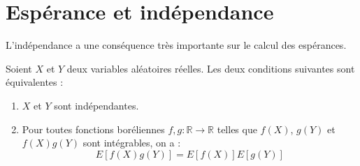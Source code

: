 \section{Espérance et indépendance}
L'indépendance a une conséquence très importante sur le calcul des espérances.
\begin{proposition}
Soient $X$ et $Y$ deux variables aléatoires réelles. Les deux conditions suivantes sont équivalentes :
\begin{enumerate}
    \item[i)] $X$ et $Y$ sont indépendantes.
    \item[ii)] Pour toutes fonctions boréliennes $f, g: \mathbb{R} \to \mathbb{R}$ telles que $f(X)$, $g(Y)$ et $f(X)g(Y)$ sont intégrables, on a :
    \[ E[f(X)g(Y)] = E[f(X)]E[g(Y)] \]
\end{enumerate}
\end{proposition}

